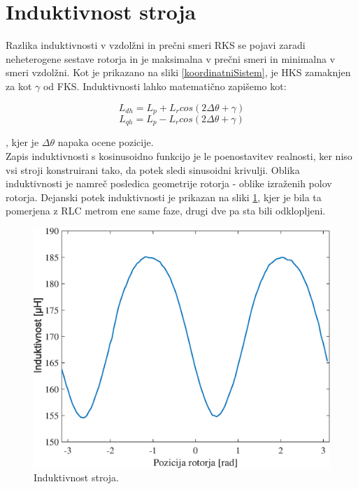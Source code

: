 \documentclass[a4paper,twoside,openright,12pt,slovene]{book}
\begin{document}
\section{Induktivnost stroja}
Razlika induktivnosti v vzdolžni in prečni smeri RKS se pojavi zaradi neheterogene sestave rotorja in je maksimalna v prečni smeri in minimalna v smeri vzdolžni. Kot je prikazano na sliki
\ref{koordinatniSistem}, je HKS zamaknjen za kot $\gamma$ od FKS. Induktivnosti lahko matematično zapišemo kot:

\begin{equation}
    L_{dh} = L_p + L_r cos(2\Delta\theta + \gamma)
\end{equation}
\begin{equation}
    L_{qh} = L_p - L_r cos(2\Delta\theta + \gamma)
\end{equation}

, kjer je $\Delta\theta$ napaka ocene pozicije.
\\
Zapis induktivnosti s kosinusoidno funkcijo je le poenostavitev realnosti, ker niso vsi stroji konstruirani tako, da potek sledi sinusoidni krivulji. Oblika induktivnosti je namreč posledica
geometrije rotorja - oblike izraženih polov rotorja. Dejanski potek induktivnosti je prikazan na sliki \ref{induktivnostStroja}, kjer je bila ta pomerjena z RLC metrom ene same faze, drugi dve pa sta
bili odklopljeni. 

\begin{figure}[!htbp]
    \centering
    \includegraphics[width=0.80\columnwidth]{Slike/induktivnostStroja.eps}
    \caption{\label{induktivnostStroja} Induktivnost stroja. }
\end{figure}
\end{document}
